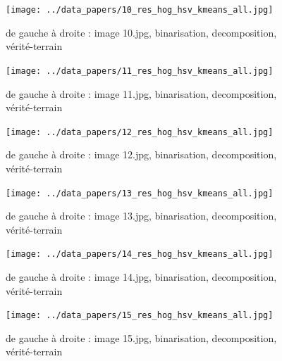 \documentclass{book}
\begin{document}
\begin{figure}[H]
\begin{center}
\texttt{[image: ../data\_papers/10\_res\_hog\_hsv\_kmeans\_all.jpg]}
\end{center}
\caption{de gauche à droite : image 10.jpg, binarisation, decomposition, vérité-terrain}
\label{10}
\end{figure}
\clearpage


\begin{figure}[H]
\begin{center}
\texttt{[image: ../data\_papers/11\_res\_hog\_hsv\_kmeans\_all.jpg]}
\end{center}
\caption{de gauche à droite : image 11.jpg, binarisation, decomposition, vérité-terrain}
\label{11}
\end{figure}
\clearpage


\begin{figure}[H]
\begin{center}
\texttt{[image: ../data\_papers/12\_res\_hog\_hsv\_kmeans\_all.jpg]}
\end{center}
\caption{de gauche à droite : image 12.jpg, binarisation, decomposition, vérité-terrain}
\label{12}
\end{figure}
\clearpage


\begin{figure}[H]
\begin{center}
\texttt{[image: ../data\_papers/13\_res\_hog\_hsv\_kmeans\_all.jpg]}
\end{center}
\caption{de gauche à droite : image 13.jpg, binarisation, decomposition, vérité-terrain}
\label{13}
\end{figure}
\clearpage


\begin{figure}[H]
\begin{center}
\texttt{[image: ../data\_papers/14\_res\_hog\_hsv\_kmeans\_all.jpg]}
\end{center}
\caption{de gauche à droite : image 14.jpg, binarisation, decomposition, vérité-terrain}
\label{14}
\end{figure}
\clearpage


\begin{figure}[H]
\begin{center}
\texttt{[image: ../data\_papers/15\_res\_hog\_hsv\_kmeans\_all.jpg]}
\end{center}
\caption{de gauche à droite : image 15.jpg, binarisation, decomposition, vérité-terrain}
\label{15}
\end{figure}
\clearpage
\end{document}
